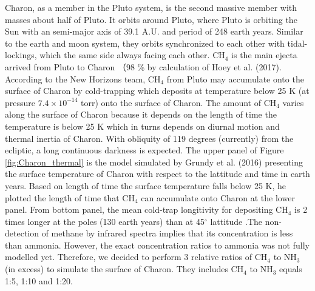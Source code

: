 Charon, as a member in the Pluto system, is the second massive member with masses about half of Pluto. It orbits around Pluto, where Pluto is orbiting the Sun with an semi-major axis of 39.1 A.U. and period of 248 earth years. Similar to the earth and moon system, they orbits synchronized to each other with tidal-lockings, which the same side always facing each other. CH$_4$ is the main ejecta arrived from Pluto to Charon （98 \% by calculation of Hoey et al. (2017)\cite{hoey2017rarefied}. According to the New Horizons team, CH$_4$ from Pluto may accumulate onto the surface of Charon by cold-trapping which deposits at temperature below 25 K (at pressure $7.4 \times 10^{-14}$ torr) onto the surface of Charon\cite{grundy2016formation}. The amount of CH$_4$ varies along the surface of Charon because it depends on the length of time the temperature is below 25 K which in turns depends on diurnal motion and thermal inertia of Charon. With obliquity of 119 degrees (currently) from the ecliptic, a long continuous darkness is expected. The upper panel of Figure \ref{fig:Charon_thermal} is the model simulated by Grundy et al. (2016)\cite{grundy2016formation} presenting the surface temperature of Charon with respect to the lattitude and time in earth years. Based on length of time the surface temperature falls below 25 K, he plotted the length of time that CH$_4$ can accumulate onto Charon at the lower panel. From bottom panel, the mean cold-trap longitivity for depositing CH$_4$ is 2 times longer at the poles (130 earth years) than at 45$^{\circ}$ lattitude \cite{grundy2016formation}.The non-detection of methane by infrared spectra implies that its concentration is less than ammonia. However, the exact concentration ratios to ammonia was not fully modelled yet. Therefore, we decided to perform 3 relative ratios of CH$_4$ to NH$_3$ (in excess) to simulate the surface of Charon. They includes CH$_4$ to NH$_3$ equals 1:5, 1:10 and 1:20.\\

